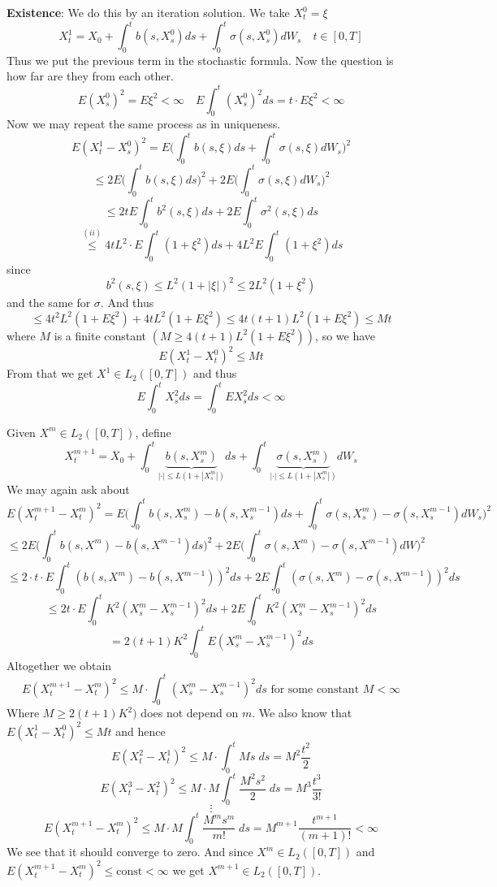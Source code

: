 \documentclass[english]{article}
\newcommand{\ub}{\underbrace}
\newcommand{\note}[1]{\noindent\textbf{#1}}
\begin{document}
\note{Existence}: We do this by an iteration solution. We take $X^0_t = \xi$
$$X^1_t = X_0 + \int^t_0 b(s, X^0_s) ds + \int^t_0 \sigma(s,X^0_s) dW_s\quad t \in [0,T]$$
Thus we put the previous term in the stochastic formula. Now the question is how far are they from each other.
$$E(X^0_s)^2 = E\xi^2 < \infty \quad E\int^t_0 (X^0_s)^2 ds = t \cdot E\xi^2 < \infty$$
Now we may repeat the same process as in uniqueness.
$$E(X^1_t - X^0_s)^2 = E\Big(\int^t_0 b(s, \xi) ds + \int^t_0 \sigma(s, \xi) dW_s\Big)^2$$
$$\leq 2E\Big(\int^t_0 b(s, \xi) ds \Big)^2 + 2E\Big(\int^t_0 \sigma(s, \xi) dW_s\Big)^2$$
$$\leq 2t E\int^t_0 b^2(s,\xi) ds + 2E\int^t_0 \sigma^2(s, \xi) ds$$
$$\stackrel{(ii)}\leq 4t L^2 \cdot E \int^t_0 (1+ \xi^2) ds + 4L^2 E\int^t_0 (1+ \xi^2) ds$$
since
$$b^2(s,\xi) \leq L^2 (1+ |\xi|)^2 \leq 2L^2(1+\xi^2)$$
and the same for $\sigma$. And thus
$$\leq 4t^2L^2 (1+ E\xi^2) + 4tL^2 (1+ E\xi^2) \leq 4t(t+1)L^2(1+E\xi^2) \leq Mt$$
where $M$ is a finite constant $(M\geq 4(t+1)L^2(1+E\xi^2))$, so we have
$$E(X^1_t - X^0_t)^2 \leq Mt$$
From that we get $X^1 \in L_2([0,T])$ and thus 
$$E\int^t_0 X^2_s ds = \int^t_0 EX^2_s ds < \infty$$

Given $X^m \in L_2([0,T])$, define $$X^{m+1}_t = X_0 + \int^t_0 \ub{b(s, X^m_s)}_{|\cdot| \leq L(1+|X^m_s|)} ds + \int^t_0 \ub{\sigma(s, X^m_s)}_{|\cdot| \leq L(1+|X^m_s|)} dW_s$$
We may again ask about
$$E(X^{m+1}_t - X^m_t)^2 = E\Big(\int^t_0 b(s, X^m_s) - b(s, X^{m-1}_s) ds + \int^t_0 \sigma(s, X^m_s) - \sigma(s, X^{m-1}_s) dW_s \Big)^2$$
$$\leq 2 E\Big(\int^t_0 b(s, X^m) - b(s, X^{m-1}) ds \Big)^2 + 2E\Big( \int^t_0 \sigma(s, X^m) - \sigma(s, X^{m-1}) dW \Big)^2$$
$$ \leq 2\cdot t \cdot E \int^t_0 (b(s, X^m) - b(s, X^{m-1}))^2 ds + 2E\int^t_0 (\sigma(s,X^m) - \sigma(s, X^{m-1}))^2 ds$$
$$\leq 2t \cdot E\int^t_0 K^2(X^m_s - X^{m-1}_s)^2 ds + 2E\int^t_0 K^2 (X^m_s - X^{m-1}_s)^2 ds$$
$$=2(t+1) K^2 \int^t_0 E(X^m_s - X^{m-1}_s)^2 ds$$
Altogether we obtain
$$E(X^{m+1}_t - X^m_t)^2 \leq M\cdot \int^t_0 (X^m_s - X^{m-1}_s)^2 ds \text{ for some constant }M< \infty$$
Where $M\geq 2(t+1)K^2)$ does not depend on $m$. We also know that $E(X^1_t - X^0_t)^2 \leq Mt$ and hence
$$E(X^2_t - X^1_t)^2 \leq M \cdot \int^t_0 Ms \;ds = M^2 \frac{t^2}2$$
$$E(X^3_t - X^2_t)^2 \leq M \cdot M \int^t_0 \frac{M^2 s^2}2 \;ds = M^3 \frac{t^3}{3!}$$
$$\vdots$$
$$E(X^{m+1}_t - X^m_t)^2 \leq M \cdot M \int^t_0 \frac{M^m s^m}{m!} \;ds = M^{m+1} \frac{t^{m+1}}{(m+1)!} < \infty$$
We see that it should converge to zero. And since $X^m \in L_2([0,T])$ and $E(X^{m+1}_t - X^m_t)^2 \leq \text{const} < \infty$ we get $X^{m+1} \in L_2([0,T])$. \newline
\end{document}
